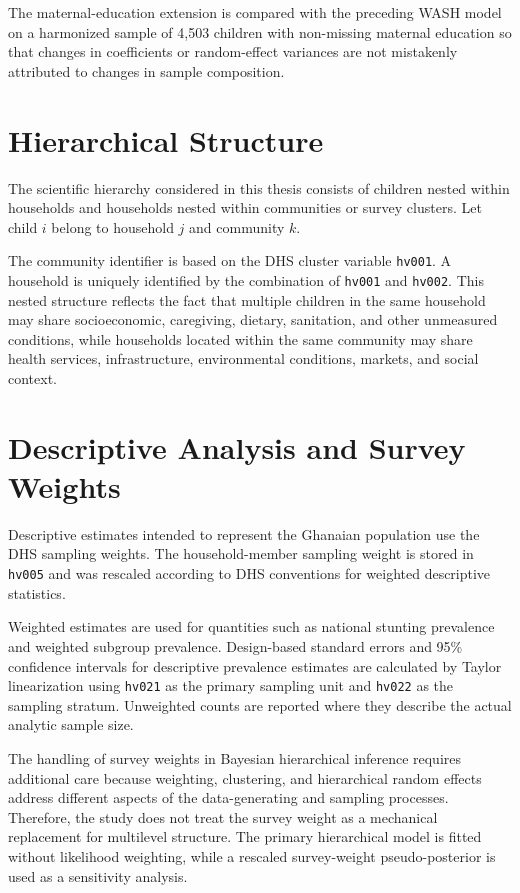 The maternal-education extension is compared with the preceding WASH model on a harmonized sample of 4,503 children with non-missing maternal education so that changes in coefficients or random-effect variances are not mistakenly attributed to changes in sample composition.

\section{Hierarchical Structure}

The scientific hierarchy considered in this thesis consists of children nested within households and households nested within communities or survey clusters. Let child $i$ belong to household $j$ and community $k$.

The community identifier is based on the DHS cluster variable \texttt{hv001}. A household is uniquely identified by the combination of \texttt{hv001} and \texttt{hv002}. This nested structure reflects the fact that multiple children in the same household may share socioeconomic, caregiving, dietary, sanitation, and other unmeasured conditions, while households located within the same community may share health services, infrastructure, environmental conditions, markets, and social context.

\section{Descriptive Analysis and Survey Weights}

Descriptive estimates intended to represent the Ghanaian population use the DHS sampling weights. The household-member sampling weight is stored in \texttt{hv005} and was rescaled according to DHS conventions for weighted descriptive statistics.

Weighted estimates are used for quantities such as national stunting prevalence and weighted subgroup prevalence. Design-based standard errors and 95\% confidence intervals for descriptive prevalence estimates are calculated by Taylor linearization using \texttt{hv021} as the primary sampling unit and \texttt{hv022} as the sampling stratum. Unweighted counts are reported where they describe the actual analytic sample size.

The handling of survey weights in Bayesian hierarchical inference requires additional care because weighting, clustering, and hierarchical random effects address different aspects of the data-generating and sampling processes. Therefore, the study does not treat the survey weight as a mechanical replacement for multilevel structure. The primary hierarchical model is fitted without likelihood weighting, while a rescaled survey-weight pseudo-posterior is used as a sensitivity analysis.

